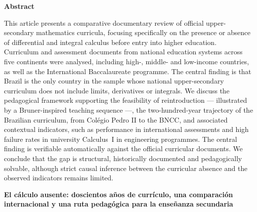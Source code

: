 \documentclass[12pt,a4paper,oneside]{article}
\begin{document}
{\centering\textbf{Abstract}\par}\vspace{2pt}
{\small\noindent
This article presents a comparative documentary review of official
upper-secondary mathematics curricula, focusing specifically on the
presence or absence of differential and integral calculus before
entry into higher education. Curriculum and assessment documents from
national education systems across five continents were analysed,
including high-, middle- and low-income countries, as well as the
International Baccalaureate programme. The central finding is that
Brazil is the only country in the sample whose national upper-secondary
curriculum does not include limits, derivatives or integrals. We discuss
the pedagogical framework supporting the feasibility of reintroduction ---
illustrated by a Bruner-inspired teaching sequence ---,
the two-hundred-year trajectory of the
Brazilian curriculum, from Colégio Pedro II to the BNCC, and associated
contextual indicators, such as performance in international assessments
and high failure rates in university Calculus~I in engineering programmes.
The central finding is verifiable automatically against the official
curricular documents.
We conclude that the gap is structural, historically documented and
pedagogically solvable, although strict causal inference between the
curricular absence and the observed indicators remains limited.\par}

\smallskip
{}

\medskip

\begin{center}
{\fontsize{14}{17}\selectfont\bfseries El cálculo ausente: doscientos años de currículo, una
comparación internacional y una ruta pedagógica para la enseñanza secundaria}
\end{center}
\vspace{2pt}
\end{document}
